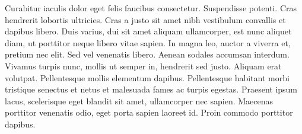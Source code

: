 \documentclass[a4paper,11pt]{article}
\begin{document}
    Curabitur iaculis dolor eget felis faucibus consectetur. Suspendisse
    potenti.  Cras hendrerit lobortis ultricies. Cras a justo sit amet nibh
    vestibulum convallis et dapibus libero. Duis varius, dui sit amet aliquam
    ullamcorper, est nunc aliquet diam, ut porttitor neque libero vitae sapien.
    In magna leo, auctor a viverra et, pretium nec elit. Sed vel venenatis
    libero. Aenean sodales accumsan interdum. Vivamus turpis nunc, mollis ut
    semper in, hendrerit sed justo. Aliquam erat volutpat. Pellentesque mollis
    elementum dapibus.  Pellentesque habitant morbi tristique senectus et netus
    et malesuada fames ac turpis egestas. Praesent ipsum lacus, scelerisque
    eget blandit sit amet, ullamcorper nec sapien. Maecenas porttitor venenatis
    odio, eget porta sapien laoreet id. Proin commodo porttitor dapibus.
\end{document}
